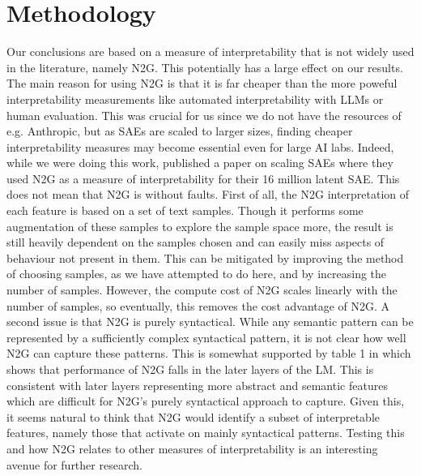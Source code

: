 \section{Methodology}
\label{sec:n2g_interpretability}
Our conclusions are based on a measure of interpretability that is not widely used in the literature, namely N2G.
This potentially has a large effect on our results.
The main reason for using N2G is that it is far cheaper than the more poweful interpretability measurements like automated interpretability with LLMs or human evaluation.
This was crucial for us since we do not have the resources of e.g. Anthropic, but as SAEs are scaled to larger sizes, finding cheaper interpretability measures may become essential even for large AI labs.
Indeed, while we were doing this work, \textcite{gao_scaling_2024} published a paper on scaling SAEs where they used N2G as a measure of interpretability for their 16 million latent SAE.
This does not mean that N2G is without faults.
First of all, the N2G interpretation of each feature is based on a set of text samples.
Though it performs some augmentation of these samples to explore the sample space more, the result is still heavily dependent on the samples chosen and can easily miss aspects of behaviour not present in them.
This can be mitigated by improving the method of choosing samples, as we have attempted to do here, and by increasing the number of samples.
However, the compute cost of N2G scales linearly with the number of samples, so eventually, this removes the cost advantage of N2G.
A second issue is that N2G is purely syntactical.
While any semantic pattern can be represented by a sufficiently complex syntactical pattern, it is not clear how well N2G can capture these patterns.
This is somewhat supported by table 1 in \textcite{foote_neuron_2023} which shows that performance of N2G falls in the later layers of the LM.
This is consistent with later layers representing more abstract and semantic features which are difficult for N2G's purely syntactical approach to capture.
Given this, it seems natural to think that N2G would identify a subset of interpretable features, namely those that activate on mainly syntactical patterns.
Testing this and how N2G relates to other measures of interpretability is an interesting avenue for further research.

